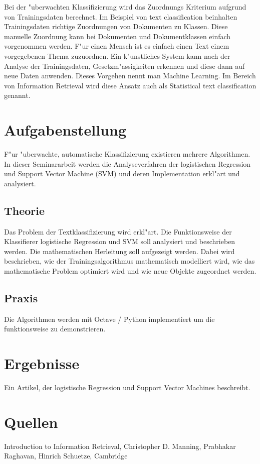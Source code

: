 \documentclass[11pt]{article}
\begin{document}
Bei der "uberwachten Klassifizierung wird das Zuordnungs Kriterium aufgrund von Trainingsdaten berechnet. Im Beispiel von text classification beinhalten Trainingsdaten richtige Zuordnungen von Dokumenten zu Klassen. Diese manuelle Zuordnung kann bei Dokumenten und Dokumentklassen einfach vorgenommen werden. F"ur einen Mensch ist es einfach einen Text einem vorgegebenen Thema zuzuordnen. Ein k"unstliches System kann nach der Analyse der Trainingsdaten, Gesetzm"assigkeiten erkennen und diese dann auf neue Daten anwenden. Dieses Vorgehen nennt man Machine Learning. Im Bereich von Information Retrieval wird diese Ansatz auch als Statistical text classification genannt.

\section{Aufgabenstellung}
\label{sec-2}

F"ur "uberwachte, automatische Klassifizierung existieren mehrere Algorithmen. In dieser Seminararbeit werden die Analyseverfahren der logistischen Regression und Support Vector Machine (SVM) und deren Implementation erkl"art und analysiert.

\subsection{Theorie}
\label{sec-2-1}
Das Problem der Textklassifizierung wird erkl"art. Die Funktionsweise der Klassifierer logistische Regression und SVM soll analysiert und beschrieben werden. Die mathematischen Herleitung soll aufgezeigt werden. Dabei wird beschrieben, wie der Trainingsalgorithmus mathematisch modelliert wird, wie das mathematische Problem optimiert wird und wie neue Objekte zugeordnet werden.

\subsection{Praxis}
\label{sec-2-2}

Die Algorithmen werden mit Octave / Python implementiert um die funktionsweise zu demonstrieren.

\section{Ergebnisse}
\label{sec-3}

Ein Artikel, der logistische Regression und Support Vector Machines beschreibt.
\section{Quellen}
\label{sec-4}

Introduction  to Information Retrieval, Christopher D. Manning, Prabhakar Raghavan, Hinrich Schuetze, Cambridge
\end{document}
